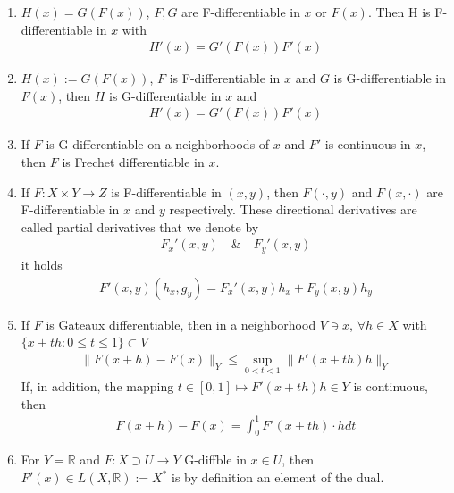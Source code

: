 \documentclass[a4paper,11pt,fleqn]{book}
\theoremstyle{definition}
\theoremstyle{remark}
\begin{document}
\begin{enumerate}
	\item $H(x) = G(F(x))$, $F, G$ are F-differentiable in $x$ or $F(x)$. Then H is F-differentiable in $x$ with
		\begin{align*}
			H'(x) = G'(F(x))F'(x)
		\end{align*}
	\item $H(x) := G(F(x))$, $F$ is F-differentiable in $x$ and $G$ is G-differentiable in $F(x)$, then $H$ is G-differentiable in $x$ and 
		\begin{align*}
			H'(x) = G'(F(x)) F'(x)
		\end{align*}
	\item If $F$ is G-differentiable on a neighborhoods of $x$ and $F'$ is continuous in $x$, then $F$ is Frechet differentiable in $x$. 
	\item If $F:X \times Y \rightarrow Z$ is F-differentiable in $(x, y)$, then $F( \cdot, y )$ and $F(x, \cdot)$ are F-differentiable in $x$ and $y$ respectively. These directional derivatives are called partial derivatives that we denote by
		\begin{align*}
			F_x'(x, y) \quad \& \quad F_y'(x, y)
		\end{align*}
		it holds 
		\begin{align*}
			F'(x, y)(h_x, g_y) = F_x'(x, y)h_x + F_y(x, y)h_y
		\end{align*}
	\item If $F$ is Gateaux differentiable, then in a neighborhood $V \ni x$, $\forall h \in X$ with $\{x + th: 0 \le t \le 1\} \subset V$
		\begin{align*}
			\|F(x + h) - F(x)\|_Y \le \sup_{0 < t < 1} \|F'(x + th) h\|_Y
		\end{align*}
		If, in addition, the mapping $t \in [0, 1] \mapsto F'(x + th) h \in Y$ is continuous, then 
		\begin{align*}
			F(x + h) - F(x) = \int_0^1 F'(x + th)\cdot h dt
		\end{align*}
	\item For $Y = \mathbb{R}$ and $F: X \supset U \rightarrow Y$ G-diffble in $x \in U$, then $F'(x) \in L(X, \mathbb{R}):= X^*$ is by definition an element of the dual. 
\end{enumerate}
\end{document}
